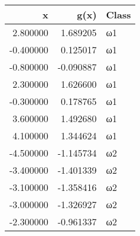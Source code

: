 \begin{tabular}{rrl}
\toprule
x & g(x) & Class \\
\midrule
2.800000 & 1.689205 & ω1 \\
-0.400000 & 0.125017 & ω1 \\
-0.800000 & -0.090887 & ω1 \\
2.300000 & 1.626600 & ω1 \\
-0.300000 & 0.178765 & ω1 \\
3.600000 & 1.492680 & ω1 \\
4.100000 & 1.344624 & ω1 \\
-4.500000 & -1.145734 & ω2 \\
-3.400000 & -1.401339 & ω2 \\
-3.100000 & -1.358416 & ω2 \\
-3.000000 & -1.326927 & ω2 \\
-2.300000 & -0.961337 & ω2 \\
\bottomrule
\end{tabular}
